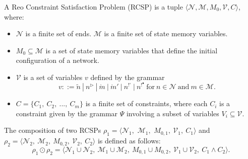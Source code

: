 \begin{definition}[RCSP] A Reo Constraint Satisfaction Problem (RCSP) is a tuple $\langle \mathcal{N}, \mathcal{M}, M_0, \mathcal{V}, C \rangle$, where:
\begin{itemize}
\item $\mathcal{N}$ is a finite set of ends.
 $\mathcal{M}$ is a finite set of state memory variables.
\item $M_0 \subseteq \mathcal{M}$ is a set of state memory variables that define the initial configuration of a network.
\item $\mathcal{V}$ is a set of variables $v$ defined by the grammar $$v ::= \tilde{n}\ |\ n^\triangleright\ |\ \mathring{m}\ |\ \mathring{m}'\ |\ n^{!^\circ}\ |\ n^{!^\bullet}\ \text{for}\ n \in \mathcal{N}\ \text{and}\ m \in \mathcal{M}.$$ %
\item $C=\{C_1,\ C_2,\ ...,\ C_m\}$ is a finite set of constraints, where each $C_i$ is a constraint given by the grammar $\Psi$ involving a subset of variables $V_i \subseteq \mathcal{V}$.
\end{itemize}
\end{definition} 

\begin{definition}
\label{def:compositionodot}
The composition of two RCSPs $\rho_1=\langle \mathcal{N}_1,$ $\mathcal{M}_1,$ $M_{0,1},\ \mathcal{V}_1,\ C_1 \rangle$ and $\rho_2=\langle \mathcal{N}_2,\ \mathcal{M}_2,\ M_{0,2},\ \mathcal{V}_2,\ C_2 \rangle$ is defined as follows:
$$\rho_1 \odot \rho_2=\langle \mathcal{N}_1 \cup \mathcal{N}_2,\ \mathcal{M}_1 \cup \mathcal{M}_2,\  M_{0,1} \cup M_{0,2},\ \mathcal{V}_1 \cup \mathcal{V}_2,\ C_1 \wedge C_2 \rangle.$$
\end{definition}


